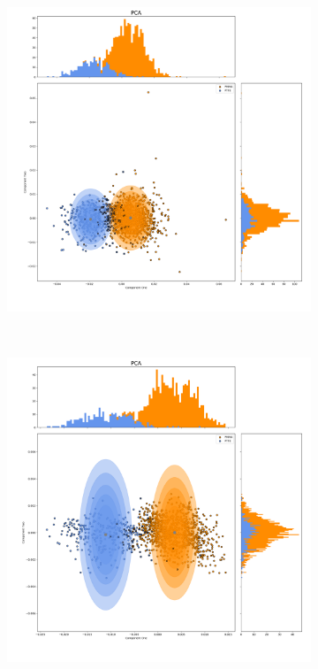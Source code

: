 \documentclass[a4paper,11pt]{article}
\begin{document}
\begin{figure}[t!]
    \centering
    \begin{subfigure}[b]{0.32\textwidth}
        \includegraphics[width=\textwidth]{figures/PCAgoodbefore.png}
    \end{subfigure}
    ~ %
    \begin{subfigure}[b]{0.32\textwidth}
        \includegraphics[width=\textwidth]{figures/PCAgoodafter.png}

\end{subfigure}
\end{figure}
\end{document}
